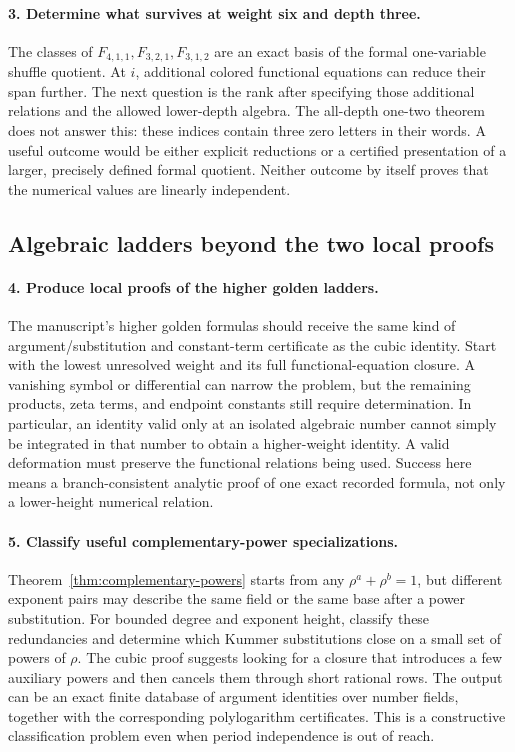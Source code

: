 \paragraph{3. Determine what survives at weight six and depth three.}
The classes of \(F_{4,1,1},F_{3,2,1},F_{3,1,2}\) are an exact basis
of the formal one-variable shuffle quotient.
At \(i\), additional colored functional equations can reduce their
span further. The next question is the rank after specifying those
additional relations and the allowed lower-depth algebra.
The all-depth one-two theorem does not answer this: these indices
contain three zero letters in their words.
A useful outcome would be either explicit reductions or a certified
presentation of a larger, precisely defined formal quotient.
Neither outcome by itself proves that the numerical values are
linearly independent.

\subsection{Algebraic ladders beyond the two local proofs}

\paragraph{4. Produce local proofs of the higher golden ladders.}
The manuscript's higher golden formulas should receive the same kind
of argument/substitution and constant-term certificate as the cubic
identity. Start with the lowest unresolved weight and its full
functional-equation closure.
A vanishing symbol or differential can narrow the problem, but the
remaining products, zeta terms, and endpoint constants still require
determination. In particular, an identity valid only at an isolated
algebraic number cannot simply be integrated in that number to obtain
a higher-weight identity. A valid deformation must preserve the
functional relations being used.
Success here means a branch-consistent analytic proof of one exact
recorded formula, not only a lower-height numerical relation.

\paragraph{5. Classify useful complementary-power specializations.}
Theorem~\ref{thm:complementary-powers} starts from any
\(\rho^a+\rho^b=1\), but different exponent pairs may describe the
same field or the same base after a power substitution.
For bounded degree and exponent height, classify these redundancies
and determine which Kummer substitutions close on a small set of
powers of \(\rho\).
The cubic proof suggests looking for a closure that introduces a few
auxiliary powers and then cancels them through short rational rows.
The output can be an exact finite database of argument identities
over number fields, together with the corresponding polylogarithm
certificates. This is a constructive classification problem even when
period independence is out of reach.

